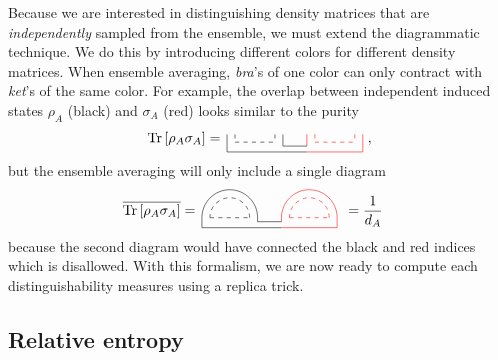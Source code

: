\documentclass[a4paper,11pt]{article}
\newcommand{\Tr}{\text{Tr}}
\begin{document}
Because we are interested in distinguishing density matrices that are \textit{independently} sampled from the ensemble, we must extend the diagrammatic technique. We do this by introducing different colors for different density matrices. When ensemble averaging, \textit{bra}'s of one color can only contract with \textit{ket}'s of the same color. For example, the overlap between independent induced states $\rho_A$ (black) and $\sigma_A$ (red) looks similar to the purity
\begin{align}
    \Tr \left[\rho_A \sigma_A\right] = %
    \,
    \tikz[scale=1.0,baseline=0ex]{
    \draw[dashed] (0,0.2)-- (0,0);
    \draw[dashed] (0,0) -- (1,0);
    \draw[dashed]  (1,0.2) -- (1,0);
    \draw (-0.2,0.2)-- (-0.2,-0.25);
    \draw (1.2,-0.1)-- (1.2,0.2);
    \draw[dashed,red] (2,0.2)-- (2,0);
    \draw[dashed,red] (2,0) -- (3,0);
    \draw[dashed,red]  (3,0.2) -- (3,0);
    \draw[red] (1.8,0.2)-- (1.8,-0.1);
    \draw[red] (3.2,-0.25)-- (3.2,0.2);
    \draw (1.2,-0.1)-- (1.8,-0.1);
    \draw (-0.2,-0.25) -- (1.8,-0.25);
    \draw[red] (1.8,-0.25) -- (3.2,-0.25);
    }\ ,
\end{align}
but the ensemble averaging will only include a single diagram
\begin{align}
    \overline{\Tr \left[\rho_A \sigma_A\right]} &=%
    \,
    \tikz[scale=1.0,baseline=0.5ex]{
    \draw[dashed] (0,0) -- (1,0);
    \draw (-0.2,0.)-- (-0.2,-0.25);
    \draw (1.2,-0.1)-- (1.2,0.);
    \draw[dashed,red] (2,0) -- (3,0);
    \draw[red] (1.8,0.)-- (1.8,-0.1);
    \draw[red] (3.2,-0.25)-- (3.2,0.);
    \draw (1.2,-0.1)-- (1.8,-0.1);
    \draw[black] (-0.2,-0.25) -- (1.8,-0.25);
    \draw[red] (1.8,-0.25) -- (3.2,-0.25);
    \draw[dashed] (1.0,0) arc (0:180:0.5);
    \draw[dashed,red] (3.0,0) arc (0:180:0.5);
    \draw (1.2,0) arc (0:180:0.7);
    \draw[red] (3.2,0) arc (0:180:0.7);
    }
\ \, = \frac{1}{d_A}
\label{overlap_diagram}
\end{align}
because the second diagram would have connected the black and red indices which is disallowed. With this formalism, we are now ready to compute each distinguishability measures using a replica trick. 

\subsection{Relative entropy}
\end{document}
